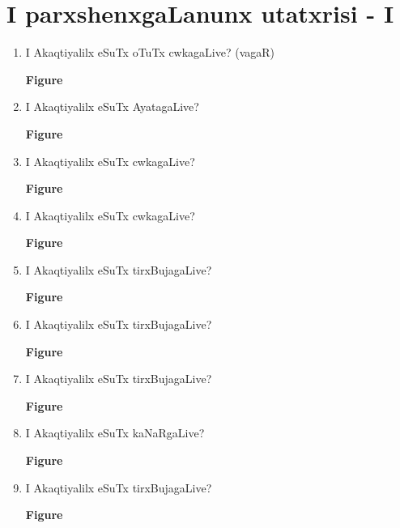 \chapter{I parxshenxgaLanunx utatxrisi - {\rm I}}

\begin{enumerate}
\renewcommand{\labelenumi}{(\rm\theenumi)}
\item I Akaqtiyalilx eSuTx oTuTx cwkagaLive? (vagaR)
\begin{center}
{\rm\bfseries Figure}
\end{center}

\item I Akaqtiyalilx eSuTx AyatagaLive?
\begin{center}
{\rm\bfseries Figure}
\end{center}

\item I Akaqtiyalilx eSuTx cwkagaLive?
\begin{center}
{\rm\bfseries Figure}
\end{center}

\item I Akaqtiyalilx eSuTx cwkagaLive?
\begin{center}
{\rm\bfseries Figure}
\end{center}

\item I Akaqtiyalilx eSuTx tirxBujagaLive?
\begin{center}
{\rm\bfseries Figure}
\end{center}

\item I Akaqtiyalilx eSuTx tirxBujagaLive?
\begin{center}
{\rm\bfseries Figure}
\end{center}

\item I Akaqtiyalilx eSuTx tirxBujagaLive?
\begin{center}
{\rm\bfseries Figure}
\end{center}

\item I Akaqtiyalilx eSuTx kaNaRgaLive?
\begin{center}
{\rm\bfseries Figure}
\end{center}

\item I Akaqtiyalilx eSuTx tirxBujagaLive?
\begin{center}
{\rm\bfseries Figure}
\end{center}


\end{enumerate}
